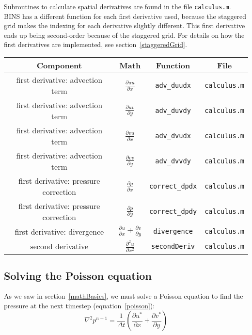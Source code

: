 \documentclass[12pt]{article}
\begin{document}
Subroutines to calculate spatial derivatives are found in the file \texttt{calculus.m}.  BINS has a different function for each first derivative used, because the staggered grid makes the indexing for each derivative slightly different.  This first derivative ends up being second-order because of the staggered grid. For details on how the first derivatives are implemented, see section~\ref{staggeredGrid}.

\begin{center}
\begin{tabular}{|c|c|c|c|}
\hline 
\bf{Component} & \bf{Math} & \bf{Function} & \bf{File}\\ 
\hline 
first derivative: advection term & \Large{$\frac{\partial uu}{\partial x}$} & \texttt{adv\_duudx} & \texttt{calculus.m}\\ 
\hline 
first derivative: advection term & \Large{$\frac{\partial uv}{\partial y}$} & \texttt{adv\_duvdy} & \texttt{calculus.m}\\ 
\hline 
first derivative: advection term & \Large{$\frac{\partial vu}{\partial x}$} & \texttt{adv\_dvudx} & \texttt{calculus.m}\\ 
\hline 
first derivative: advection term & \Large{$\frac{\partial vv}{\partial y}$} & \texttt{adv\_dvvdy} & \texttt{calculus.m}\\ 
\hline 
first derivative: pressure correction & \Large{$\frac{\partial p}{\partial x}$} & \texttt{correct\_dpdx} & \texttt{calculus.m}\\ 
\hline
first derivative: pressure correction & \Large{$\frac{\partial p}{\partial y}$} & \texttt{correct\_dpdy} & \texttt{calculus.m}\\ 
\hline
first derivative: divergence & \Large{$\frac{\partial u}{\partial x} + \frac{\partial v}{\partial y}$} & \texttt{divergence} & \texttt{calculus.m}\\ 
\hline
second derivative & \Large{$\frac{\partial^2 u}{\partial x^2}$} & \texttt{secondDeriv} & \texttt{calculus.m}\\ 
\hline 
\end{tabular} 
\end{center}

\subsection{Solving the Poisson equation}
\label{poissonSolve}
\renewcommand\arraystretch{1}
As we saw in section~\ref{mathBasics}, we must solve a Poisson equation to find the pressure at the next timestep (equation~\ref{poisson}):
\[\nabla^2 p^{n+1} = \frac{1}{\Delta t}\left( \frac{\partial u^*}{\partial x} + \frac{\partial v^*}{\partial y}\right)\]
\end{document}
